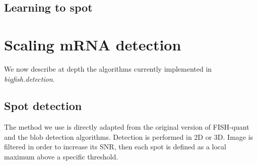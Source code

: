 \cite{lagache_statistical_2015}
\cite{ruusuvuori_evaluation_2010}
\cite{smal_quantitative_2010}

\cite{walt_scikit-image_2014}

\cite{bertin_sextractor_1996}
\cite{}

\cite{mcquin_cellprofiler_2018}
\cite{mueller_fish-quant_2013}
\cite{de_chaumont_icy_2012}
\cite{ershov_bringing_2021} %
\cite{ljosa_introduction_2009}
\cite{stoeger_computer_2015}
\cite{perkel_starfish_2019}
\cite{noauthor_mammalian_2020}
\cite{eng_transcriptome-scale_2019}
\cite{kamenova_co-translational_2019}
\cite{liao_rna_2019}
\cite{xia_spatial_2019}
\cite{tsanov_smifish_2016}
\cite{samacoits_computational_2018}
\cite{battich_image-based_2013}
\cite{savulescu_interrogating_2021}
\cite{battich_control_2015}

\cite{shariff_automated_2010}
\cite{laux_interactive_2020}
\cite{das_intracellular_2021}

\cite{bahry_rs-fish_2021}


\subsection{Learning to spot} \label{subsec:detection_dl}


\cite{bouilhol_deepspot_2022}

\cite{eichenberger_deepblink_2021}

\cite{khater_caveolae_2019}


\section{Scaling \ac{mRNA} detection} \label{sec:method}

We now describe at depth the algorithms currently implemented in \emph{bigfish.detection}.

\subsection{Spot detection} \label{subsec:spot_detection}

The method we use is directly adapted from the original version of FISH-quant\cite{mueller_fish-quant_2013} and the blob detection algorithms\cite{walt_scikit-image_2014}.
Detection is performed in 2D or 3D. Image is filtered in order to increase its \ac{SNR}, then each spot is defined as a local maximum above a specific threshold.

